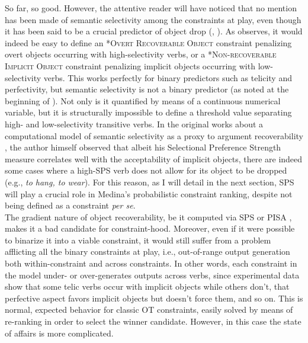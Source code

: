 So far, so good. However, the attentive reader will have noticed that no mention has been made of semantic selectivity among the constraints at play, even though it has been said to be a crucial predictor of object drop (, ). As \textcite[76]{Medina2007} observes, it would indeed be easy to define an \textsc{*Overt Recoverable Object} constraint penalizing overt objects occurring with high-selectivity verbs, or a \textsc{*Non-recoverable Implicit Object} constraint penalizing implicit objects occurring with low-selectivity verbs. This works perfectly for binary predictors such as telicity and perfectivity, but semantic selectivity is not a binary predictor (as noted at the beginning of ). Not only is it quantified by means of a continuous numerical variable, but it is structurally impossible to define a threshold value separating high- and low-selectivity transitive verbs. In the original works about a computational model of semantic selectivity as a proxy to argument recoverability \parencite{Resnik1993, Resnik1996}, the author himself observed that albeit his Selectional Preference Strength measure correlates well with the acceptability of implicit objects, there are indeed some cases where a high-SPS verb does not allow for its object to be dropped (e.g., \textit{to hang, to wear}). For this reason, as I will detail in the next section, SPS will play a crucial role in Medina's probabilistic constraint ranking, despite not being defined as a constraint \textit{per se}.\\
The gradient nature of object recoverability, be it computed via SPS \parencite{Resnik1993, Resnik1996} or PISA \parencite{CappelliLenciPISA}, makes it a bad candidate for constraint-hood. Moreover, even if it were possible to binarize it into a viable constraint, it would still suffer from a problem afflicting all the binary constraints at play, i.e., out-of-range output generation both within-constraint and across constraints. In other words, each constraint in the model under- or over-generates outputs across verbs, since experimental data show that some telic verbs occur with implicit objects while others don't, that perfective aspect favors implicit objects but doesn't force them, and so on. This is normal, expected behavior for classic OT constraints, easily solved by means of re-ranking in order to select the winner candidate. However, in this case the state of affairs is more complicated.\\

